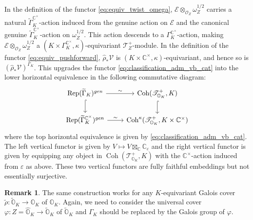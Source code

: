 \documentclass[11pt, a4paper]{amsart}
\newcommand{\C}{\mathbb{C}}
\newcommand{\orb}{\mathbb{O}}
\newcommand{\orbk}{\orb_{K}}
\newcommand{\torbk}{\widetilde{\orb}_{K}}
\newcommand{\horbk}{\widehat{\orb}_{K}}
\newcommand{\cE}{\mathcal{E}}
\newcommand{\cV}{\mathcal{V}}
\newcommand{\tGamma}{\widetilde{\Gamma}}
\DeclareMathOperator{\Rep}{Rep}
\DeclareMathOperator{\Coh}{Coh}
\newcommand{\smallhalf}{{\scriptscriptstyle 1/2}}
\newcommand{\TT}{\mathscr{T}}
\newcommand{\cm}{\C^\times}
\newcommand{\OO}{\mathcal{O}}
\theoremstyle{definition}
\newtheorem{Rem}[Thm]{Remark}
\numberwithin{equation}{section}
\begin{document}
In the definition of the functor \eqref{eq:equiv_twist_omega}, $\cE \otimes_{\OO_Z} \omega_Z^{\smallhalf}$ carries a natural $\tGamma_K^{\cm}$-action induced from the genuine action on $\cE$ and the canonical genuine $\tGamma_K^{\cm}$-action on $\omega_Z^{\smallhalf}$. This action descends to a $\Gamma_K^{\cm}$-action, making $\cE \otimes_{\OO_Z} \omega_Z^{\smallhalf}$ a $(K \times \Gamma_K^{\cm}, \kappa)$-equivariant $\TT^+_Z$-module. In the definition of the functor \eqref{eq:equiv_pushforward}, $\hat{\rho}_* \cV$ is $(K \times \cm, \kappa)$-equivariant, and hence so is $(\hat{\rho}_* \cV)^{\Gamma_K}$. This upgrades the functor \eqref{eq:classification_adm_vb_cat} into the lower horizontal equivalence in the following commutative diagram:
\begin{equation} \label{diag:lift_graded}
	\begin{tikzcd}
		\Rep(\tGamma_K)^{gen} \ar[r, "\sim"] \ar[d, hook] & \Coh(\TT^+_{\orbk}, K) \ar[d, hook] \\
		\Rep(\tGamma_K^{\cm})^{gen} \ar[r, "\sim"] & \Coh^\kappa(\TT^+_{\orbk}, K \times \cm)
	\end{tikzcd}
\end{equation}
where the top horizontal equivalence is given by \eqref{eq:classification_adm_vb_cat}. The left vertical functor is given by $V \mapsto V \boxtimes_\C \C_\varepsilon$ and the right vertical functor is given by equipping any object in $\Coh(\TT^+_{\orbk}, K)$ with the $\cm$-action induced from $\varepsilon$ as above. These two vertical functors are fully faithful embeddings but not essentially surjective. 

\begin{Rem} \label{rem:strong_cm_action_Galois}
	The same construction works for any $K$-equivariant Galois cover $\tilde{\rho}: \torbk \to \orbk$ of $\orbk$. Again, we need to consider the universal cover $\varphi: Z=\horbk \to \torbk$ of $\torbk$ and $\Gamma_K$ should be replaced by the Galois group of $\varphi$.
\end{Rem}
\end{document}
